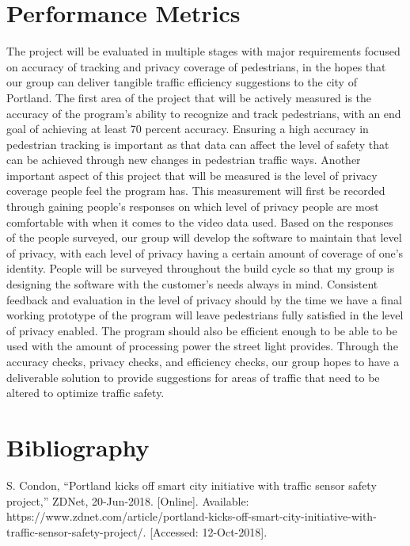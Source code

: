 \documentclass[letterpaper,10pt]{article}
\begin{document}
\section{Performance Metrics}
The project will be evaluated in multiple stages with major requirements focused on accuracy of tracking and privacy coverage of pedestrians, in the hopes that our group can deliver tangible traffic efficiency suggestions to the city of Portland. The first area of the project that will be actively measured is the accuracy of the program’s ability to recognize and track pedestrians, with an end goal of achieving at least 70 percent accuracy. Ensuring a high accuracy in pedestrian tracking is important as that data can affect the level of safety that can be achieved through new changes in pedestrian traffic ways. Another important aspect of this project that will be measured is the level of privacy coverage people feel the program has. This measurement will first be recorded through gaining people’s responses on which level of privacy people are most comfortable with when it comes to the video data used. Based on the responses of the people surveyed, our group will develop the software to maintain that level of privacy, with each level of privacy having a certain amount of coverage of one’s identity. People will be surveyed throughout the build cycle so that my group is designing the software with the customer’s needs always in mind. Consistent feedback and evaluation in the level of privacy should by the time we have a final working prototype of the program will leave pedestrians fully satisfied in the level of privacy enabled. The program should also be efficient enough to be able to be used with the amount of processing power the street light provides. Through the accuracy checks, privacy checks, and efficiency checks, our group hopes to have a deliverable solution to provide suggestions for areas of traffic that need to be altered to optimize traffic safety.

\section{Bibliography}
S. Condon, “Portland kicks off smart city initiative with traffic sensor safety project,” ZDNet, 20-Jun-2018. [Online]. Available: https://www.zdnet.com/article/portland-kicks-off-smart-city-initiative-with-traffic-sensor-safety-project/. [Accessed: 12-Oct-2018].
\end{document}
